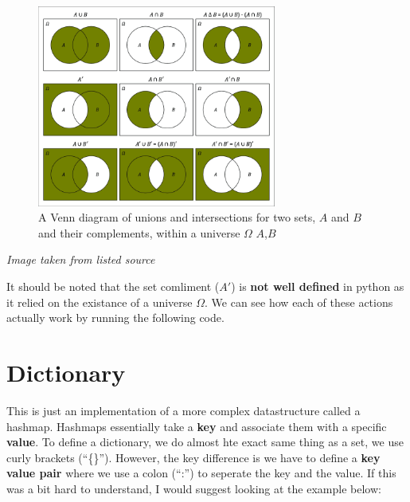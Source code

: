 \documentclass[12pt,a4paper]{book}
\newcommand{\source}[1]{\caption*{Source: {#1}} }
\begin{document}
			\begin{figure}[H]
				\centering
				\includegraphics[width=0.7\textwidth]{figures/chapter_5/sets.png}
				\caption{A Venn diagram of unions and intersections for two sets, $A$ and $B$ and their complements, within a universe $\Omega$ $A$,$B$}
				\label{fig:chap5-sets-1}
			\end{figure}
			\textit{Image taken from listed source\autocite{chap_5_set_figure_1}} 
			
			It should be noted that the set comliment ($A'$) is \textbf{not well defined} in python as it relied on the existance of a universe $\Omega$. We can see how each of these actions actually work by running the following code.

			


		\section{Dictionary} \label{sec:dictionary}
			This is just an implementation of a more complex datastructure called a hashmap. Hashmaps essentially take a \textbf{key} and associate them with a specific \textbf{value}. To define a dictionary, we do almost hte exact same thing as a set, we use curly brackets (``\{\}''). However, the key difference is we have to define a \textbf{key value pair} where we use a colon (``:'') to seperate the key and the value. If this was a bit hard to understand, I would suggest looking at the example below:
			
			
\end{document}
